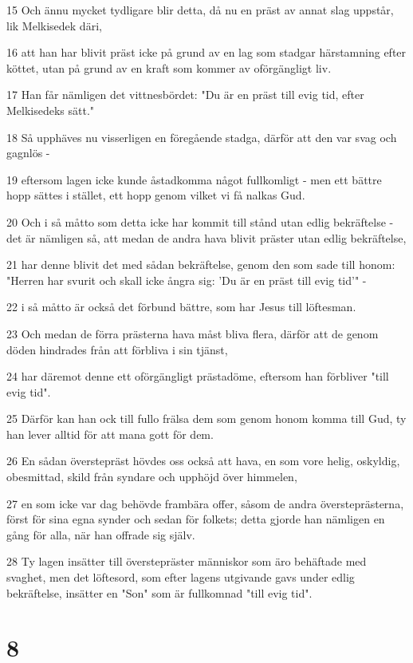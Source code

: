\par 15 Och ännu mycket tydligare blir detta, då nu en präst av annat slag uppstår, lik Melkisedek däri,
\par 16 att han har blivit präst icke på grund av en lag som stadgar härstamning efter köttet, utan på grund av en kraft som kommer av oförgängligt liv.
\par 17 Han får nämligen det vittnesbördet: "Du är en präst till evig tid, efter Melkisedeks sätt."
\par 18 Så upphäves nu visserligen en föregående stadga, därför att den var svag och gagnlös -
\par 19 eftersom lagen icke kunde åstadkomma något fullkomligt - men ett bättre hopp sättes i stället, ett hopp genom vilket vi få nalkas Gud.
\par 20 Och i så måtto som detta icke har kommit till stånd utan edlig bekräftelse - det är nämligen så, att medan de andra hava blivit präster utan edlig bekräftelse,
\par 21 har denne blivit det med sådan bekräftelse, genom den som sade till honom: "Herren har svurit och skall icke ångra sig: 'Du är en präst till evig tid'" -
\par 22 i så måtto är också det förbund bättre, som har Jesus till löftesman.
\par 23 Och medan de förra prästerna hava måst bliva flera, därför att de genom döden hindrades från att förbliva i sin tjänst,
\par 24 har däremot denne ett oförgängligt prästadöme, eftersom han förbliver "till evig tid".
\par 25 Därför kan han ock till fullo frälsa dem som genom honom komma till Gud, ty han lever alltid för att mana gott för dem.
\par 26 En sådan överstepräst hövdes oss också att hava, en som vore helig, oskyldig, obesmittad, skild från syndare och upphöjd över himmelen,
\par 27 en som icke var dag behövde frambära offer, såsom de andra översteprästerna, först för sina egna synder och sedan för folkets; detta gjorde han nämligen en gång för alla, när han offrade sig själv.
\par 28 Ty lagen insätter till överstepräster människor som äro behäftade med svaghet, men det löftesord, som efter lagens utgivande gavs under edlig bekräftelse, insätter en "Son" som är fullkomnad "till evig tid".

\chapter{8}

